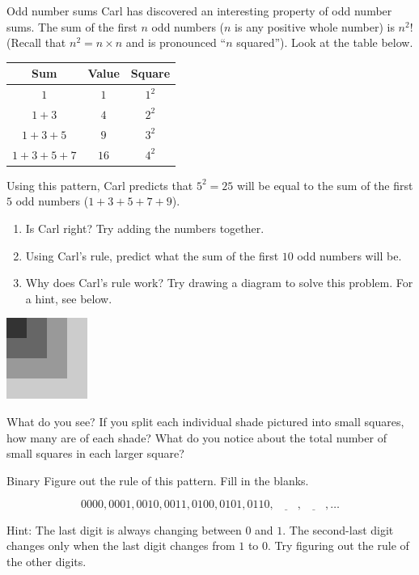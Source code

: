 \documentclass[12pt,letterpaper]{article}
\begin{document}
\begin{problem}{Odd number sums}
 Carl has discovered an interesting property of odd number sums. The sum of the
 first $n$ odd numbers ($n$ is any positive whole number) is $n^2$! (Recall that
 $n^2=n \times n$ and is pronounced ``$n$ squared''). Look at the table below.

 \begin{center}
  \begin{tabular}{|c|c|c|}
  \hline
   Sum & Value & Square \\
  \hline
   $1$ & $1$ & $1^2$ \\
   $1 + 3$ & $4$ & $2^2$ \\
   $1 + 3 + 5$ & $9$ & $3^2$ \\
   $1 + 3 + 5 + 7$ & $16$ & $4^2$ \\
   \hline
  \end{tabular}
 \end{center}

 Using this pattern, Carl predicts that $5^2=25$ will be equal to the sum of the
 first $5$ odd numbers ($1+3+5+7+9$).

 \begin{enumerate}
  \item Is Carl right? Try adding the numbers together.
  \item Using Carl's rule, predict what the sum of the first $10$ odd numbers
  will be.
  \item Why does Carl's rule work? Try drawing a diagram to solve this problem.
  For a hint, see below.
 \end{enumerate}

 \begin{center}
  \includegraphics[width=100px]{hint.png}
 \end{center}

 What do you see? If you split each individual shade pictured into small
 squares, how many are of each shade? What do you notice about the total number
 of small squares in each larger square?

\end{problem}

\begin{problem}{Binary}
 Figure out the rule of this pattern. Fill in the blanks.

 \[
  0000, 0001, 0010, 0011, 0100, 0101, 0110, \underline{\hspace{2em}},
  \underline{\hspace{2em}}, \ldots
 \]

 Hint: The last digit is always changing between $0$ and $1$. The second-last
 digit changes only when the last digit changes from $1$ to $0$. Try figuring
 out the rule of the other digits.
\end{problem}
\end{document}
